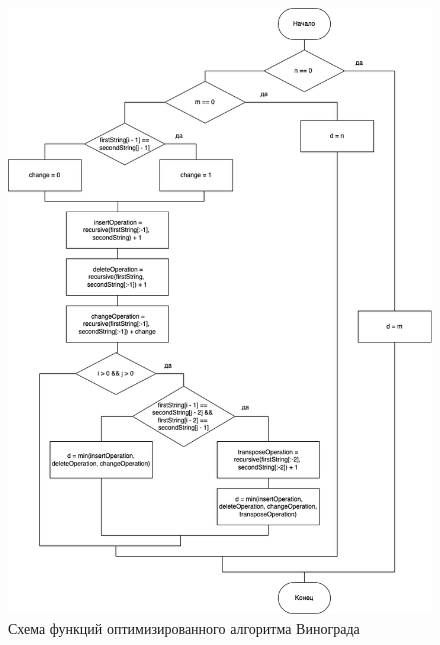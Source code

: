 \begin{figure}[ht!]
	\centering
	\includegraphics[scale=0.55]{img/dl_recursive.png}
	\caption{Схема функций оптимизированного алгоритма Винограда}
	\label{fig:mpr}
\end{figure}

\clearpage
